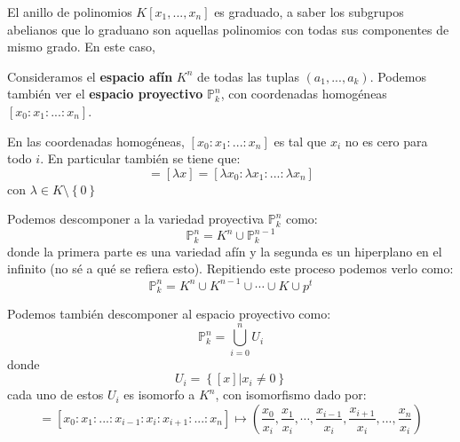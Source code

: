 \documentclass[12pt]{report}
\newcounter{it}
\theoremstyle{largebreak}
\begin{document}
    \begin{exa}
        El anillo de polinomios $K[x_1,...,x_n]$ es graduado, a saber los subgrupos abelianos que lo graduano son aquellas polinomios con todas sus componentes de mismo grado. En este caso, 
    \end{exa}

    Consideramos el \textbf{espacio afín} $K^n$ de todas las tuplas $(a_1,...,a_k)$. Podemos también ver el \textbf{espacio proyectivo} $\mathbb{P}^n_k$, con coordenadas homogéneas $[x_0:x_1:...:x_n]$.

    \begin{obs}
        En las coordenadas homogéneas, $[x_0:x_1:...:x_n]$ es tal que $x_i$ no es cero para todo $i$. En particular también se tiene que:
        \begin{equation*}
            [x]=[\lambda x]=[\lambda x_0:\lambda x_1:...:\lambda x_n]
        \end{equation*}
        con $\lambda\in K\setminus\left\{ 0\right\}$
    \end{obs}

    \begin{obs}
        Podemos descomponer a la variedad proyectiva $\mathbb{P}^n_k$ como:
        \begin{equation*}
            \mathbb{P}^n_k=K^n\cup \mathbb{P}^{ n-1}_k
        \end{equation*}
        donde la primera parte es una variedad afín y la segunda es un hiperplano en el infinito (no sé a qué se refiera esto). Repitiendo este proceso podemos verlo como:
        \begin{equation*}
            \mathbb{P}^n_k=K^n\cup K^{ n-1}\cup\cdots\cup K\cup p^t
        \end{equation*}
    \end{obs}

    \begin{obs}
        Podemos también descomponer al espacio proyectivo como:
        \begin{equation*}
            \mathbb{P}^n_k=\bigcup_{ i=0}^n U_i
        \end{equation*}
        donde
        \begin{equation*}
            U_i=\left\{[x]\Big|x_i\neq0 \right\}
        \end{equation*}
        cada uno de estos $U_i$ es isomorfo a $K^n$, con isomorfismo dado por:
        \begin{equation*}
            [x]=[x_0:x_1:...:x_{ i-1}:x_i:x_{ i+1}:...:x_n]\mapsto \left(\frac{x_0}{x_i},\frac{x_1}{x_i},\cdots,\frac{x_{ i-1}}{x_i},\frac{x_{ i+1}}{x_i},...,\frac{x_n}{x_i} \right)
        \end{equation*}
    \end{obs}
\end{document}

